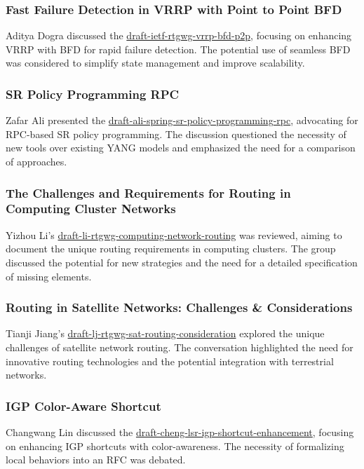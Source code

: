 \documentclass{article}
\begin{document}
\subsubsection{Fast Failure Detection in VRRP with Point to Point BFD}
Aditya Dogra discussed the \href{https://datatracker.ietf.org/doc/html/draft-ietf-rtgwg-vrrp-bfd-p2p}{draft-ietf-rtgwg-vrrp-bfd-p2p}, focusing on enhancing VRRP with BFD for rapid failure detection. The potential use of seamless BFD was considered to simplify state management and improve scalability.

\subsubsection{SR Policy Programming RPC}
Zafar Ali presented the \href{https://datatracker.ietf.org/doc/html/draft-ali-spring-sr-policy-programming-rpc}{draft-ali-spring-sr-policy-programming-rpc}, advocating for RPC-based SR policy programming. The discussion questioned the necessity of new tools over existing YANG models and emphasized the need for a comparison of approaches.

\subsubsection{The Challenges and Requirements for Routing in Computing Cluster Networks}
Yizhou Li's \href{https://datatracker.ietf.org/doc/html/draft-li-rtgwg-computing-network-routing}{draft-li-rtgwg-computing-network-routing} was reviewed, aiming to document the unique routing requirements in computing clusters. The group discussed the potential for new strategies and the need for a detailed specification of missing elements.

\subsubsection{Routing in Satellite Networks: Challenges \& Considerations}
Tianji Jiang's \href{https://datatracker.ietf.org/doc/html/draft-lj-rtgwg-sat-routing-consideration}{draft-lj-rtgwg-sat-routing-consideration} explored the unique challenges of satellite network routing. The conversation highlighted the need for innovative routing technologies and the potential integration with terrestrial networks.

\subsubsection{IGP Color-Aware Shortcut}
Changwang Lin discussed the \href{https://datatracker.ietf.org/doc/html/draft-cheng-lsr-igp-shortcut-enhancement}{draft-cheng-lsr-igp-shortcut-enhancement}, focusing on enhancing IGP shortcuts with color-awareness. The necessity of formalizing local behaviors into an RFC was debated.
\end{document}
